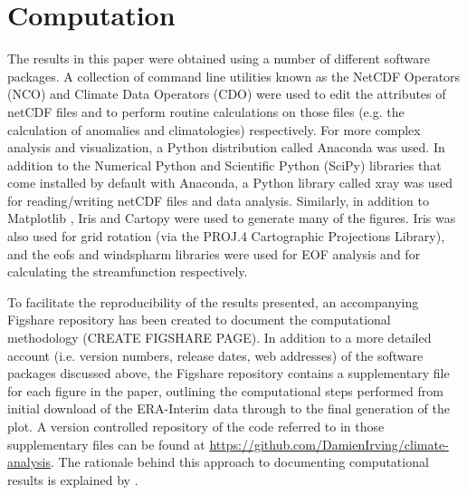 \section{Computation}

The results in this paper were obtained using a number of different software packages. A collection of command line utilities known as the NetCDF Operators (NCO) and Climate Data Operators (CDO) were used to edit the attributes of netCDF files and to perform routine calculations on those files (e.g. the calculation of anomalies and climatologies) respectively. For more complex analysis and visualization, a Python distribution called Anaconda was used. In addition to the Numerical Python \citep[NumPy;][]{VanDerWalt2011} and Scientific Python (SciPy) libraries that come installed by default with Anaconda, a Python library called xray was used for reading/writing netCDF files and data analysis. Similarly, in addition to Matplotlib \citep[the default Python plotting library;][]{Hunter2007}, Iris and Cartopy were used to generate many of the figures. Iris was also used for grid rotation (via the PROJ.4 Cartographic Projections Library), and the eofs and windspharm libraries were used for EOF analysis and for calculating the streamfunction respectively.

To facilitate the reproducibility of the results presented, an accompanying Figshare repository has been created to document the computational methodology (CREATE FIGSHARE PAGE). In addition to a more detailed account (i.e. version numbers, release dates, web addresses) of the software packages discussed above, the Figshare repository contains a supplementary file for each figure in the paper, outlining the computational steps performed from initial download of the ERA-Interim data through to the final generation of the plot. A version controlled repository of the code referred to in those supplementary files can be found at \url{https://github.com/DamienIrving/climate-analysis}. The rationale behind this approach to documenting computational results is explained by \citet{Irving2015a}.